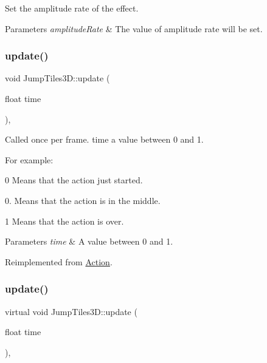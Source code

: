 Set the amplitude rate of the effect. 


\begin{DoxyParams}{Parameters}
{\em amplitude\+Rate} & The value of amplitude rate will be set. \\
\hline
\end{DoxyParams}
\mbox{\label{classJumpTiles3D_a88323f8656870818d0d517392ce70e52}} 
\subsubsection{\texorpdfstring{update()}{update()}\hspace{0.1cm}{\footnotesize\ttfamily [1/2]}}
{\footnotesize\ttfamily void Jump\+Tiles3\+D\+::update (\begin{DoxyParamCaption}\item[{float}]{time }\end{DoxyParamCaption})\hspace{0.3cm}{\ttfamily [override]}, {\ttfamily [virtual]}}

Called once per frame. time a value between 0 and 1.

For example\+:
\begin{DoxyItemize}
\item 0 Means that the action just started.
\item 0. Means that the action is in the middle.
\item 1 Means that the action is over.
\end{DoxyItemize}


\begin{DoxyParams}{Parameters}
{\em time} & A value between 0 and 1. \\
\hline
\end{DoxyParams}


Reimplemented from \hyperlink{classAction_a937e646e63915e33ad05ba149bfcf239}{Action}.

\mbox{\label{classJumpTiles3D_a4a6f11548391e787667243b8ddaccc6c}} 
\subsubsection{\texorpdfstring{update()}{update()}\hspace{0.1cm}{\footnotesize\ttfamily [2/2]}}
{\footnotesize\ttfamily virtual void Jump\+Tiles3\+D\+::update (\begin{DoxyParamCaption}\item[{float}]{time }\end{DoxyParamCaption})\hspace{0.3cm}{\ttfamily [override]}, {\ttfamily [virtual]}}

